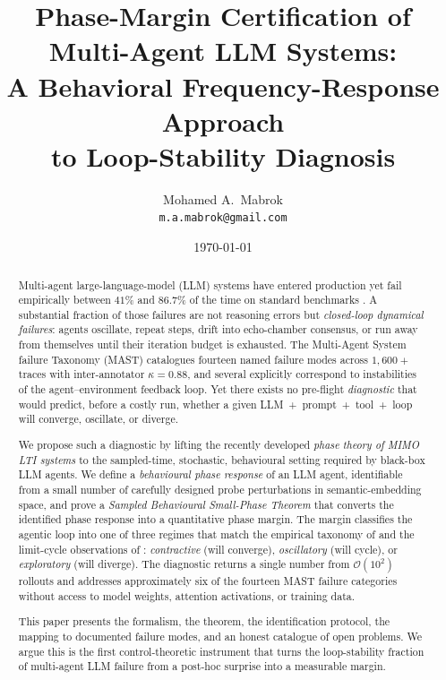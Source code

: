 \documentclass[11pt,a4paper]{article}
\title{\textbf{Phase-Margin Certification of Multi-Agent LLM Systems:\\
A Behavioral Frequency-Response Approach\\
to Loop-Stability Diagnosis}}
\author{%
  Mohamed A.~Mabrok\\[2pt]
  \small\texttt{m.a.mabrok@gmail.com}
}
\date{\today}
\theoremstyle{definition}
\theoremstyle{remark}
\begin{document}
\maketitle

\begin{abstract}
\noindent
Multi-agent large-language-model (LLM) systems have entered production yet fail
empirically between $41\%$ and $86.7\%$ of the time on standard benchmarks
\citep{Cemri2025MAST}.  A substantial fraction of those failures
are not reasoning errors but \emph{closed-loop dynamical failures}:  agents
oscillate, repeat steps, drift into echo-chamber consensus, or run away from
themselves until their iteration budget is exhausted.
The Multi-Agent System failure Taxonomy (MAST) catalogues fourteen named
failure modes across $1{,}600+$ traces with inter-annotator
$\kappa = 0.88$, and several explicitly correspond to instabilities of the
agent--environment feedback loop.  Yet there exists no pre-flight
\emph{diagnostic} that would predict, before a costly run, whether a given
LLM~+~prompt~+~tool~+~loop will converge, oscillate, or diverge.

We propose such a diagnostic by lifting the recently developed \emph{phase
theory of MIMO LTI systems} \citep{Chen2023PhaseTheory,Wang2024FirstFiveYears} to the
sampled-time, stochastic, behavioural setting required by black-box LLM
agents.  We define a \emph{behavioural phase response} of an LLM agent,
identifiable from a small number of carefully designed probe perturbations in
semantic-embedding space, and prove a \emph{Sampled Behavioural Small-Phase
Theorem} that converts the identified phase response into a quantitative
phase margin.  The margin classifies the agentic loop into one of three
regimes that match the empirical taxonomy of
\citet{Tacheny2025AgenticLoops} and the limit-cycle observations of
\citet{Wang2025AttractorCycles}:  \emph{contractive} (will converge),
\emph{oscillatory} (will cycle), or \emph{exploratory} (will diverge).  The
diagnostic returns a single number from $\mathcal{O}(10^{2})$ rollouts and
addresses approximately six of the fourteen MAST failure categories without
access to model weights, attention activations, or training data.

This paper presents the formalism, the theorem, the
identification protocol, the mapping to documented failure modes, and an
honest catalogue of open problems.  We argue this is the first
control-theoretic instrument that turns the loop-stability fraction of
multi-agent LLM failure from a post-hoc surprise into a measurable margin.
\end{abstract}
\end{document}
